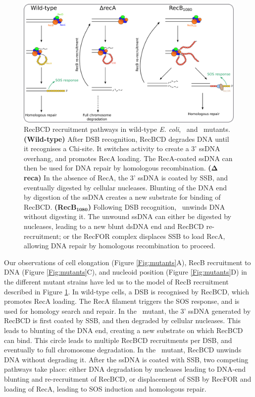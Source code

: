\begin{figure}[htbp]
    \centering
    \includegraphics[width=\textwidth]{Figures/Fig_mutants_pathways.pdf}
    \caption{RecBCD recruitment pathways in wild-type \emph{E. coli}, \dreca\ and \teneighty\ mutants. \textbf{(Wild-type)} After DSB recognition, RecBCD degrades DNA until it recognises a Chi-site. It switches activity to create a 3' ssDNA overhang, and promotes RecA loading. The RecA-coated ssDNA can then be used for DNA repair by homologous recombination. \textbf{($\mathbf{\Delta}$reca)} In the absence of RecA, the 3' ssDNA is coated by SSB, and eventually digested by cellular nucleases. Blunting of the DNA end by digestion of the ssDNA creates a new substrate for binding of RecBCD. \textbf{(RecB$\mathbf{_{1080}}$)} Following DSB recognition, \teneighty\ unwinds DNA without digesting it. The unwound ssDNA can either be digested by nucleases, leading to a new blunt dsDNA end and RecBCD re-recruitment; or the RecFOR complex displaces SSB to load RecA, allowing DNA repair by homologous recombination to proceed.}
    \label{Fig:pathways}
\end{figure}

Our observations of cell elongation (Figure \ref{Fig:mutants}A), RecB recruitment to DNA (Figure \ref{Fig:mutants}C), and nucleoid position (Figure \ref{Fig:mutants}D) in the different mutant strains have led us to the model of RecB recruitment described in Figure \ref{Fig:pathways}. In wild-type cells, a DSB is recognised by RecBCD, which promotes RecA loading. The RecA filament triggers the SOS response, and is used for homology search and repair. In the \dreca\ mutant, the 3' ssDNA generated by RecBCD is first coated by SSB, and then degraded by cellular nucleases. This leads to blunting of the DNA end, creating a new substrate on which RecBCD can bind. This circle leads to multiple RecBCD recruitments per DSB, and eventually to full chromosome degradation. In the \teneighty\ mutant, RecBCD unwinds DNA without degrading it. After the ssDNA is coated with SSB, two competing pathways take place: either DNA degradation by nucleases leading to DNA-end blunting and re-recruitment of RecBCD, or displacement of SSB by RecFOR and loading of RecA, leading to SOS induction and homologous repair.